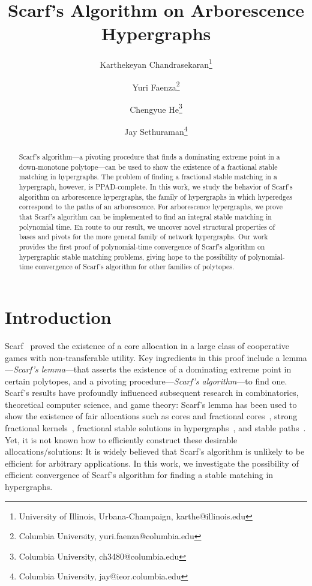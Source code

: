 \documentclass[11pt]{article}
\title{Scarf's Algorithm on Arborescence Hypergraphs}
\author{Karthekeyan Chandrasekaran\thanks{University of Illinois, Urbana-Champaign, karthe@illinois.edu}}
\author{Yuri Faenza\thanks{Columbia University, yuri.faenza@columbia.edu}}
\author{Chengyue He\thanks{Columbia University, ch3480@columbia.edu}}
\author{Jay Sethuraman\thanks{Columbia University, jay@ieor.columbia.edu}}
\affil{}
\date{}
\begin{document}
\maketitle



\begin{abstract}
Scarf’s algorithm---a pivoting procedure that finds a dominating extreme point in a down-monotone polytope---can be used to show the existence of a fractional stable matching in hypergraphs. The problem of finding a fractional stable matching in a hypergraph, however, is PPAD-complete. In this work, we study the behavior of Scarf's algorithm on arborescence hypergraphs, the family of hypergraphs in which hyperedges correspond to the paths of an arborescence. For arborescence hypergraphs, we prove that Scarf's algorithm can be implemented to find an integral stable matching in polynomial time. En route to our result, we uncover novel structural properties of bases and pivots for the more general family of network hypergraphs. Our work provides the first proof of polynomial-time convergence of Scarf's algorithm on hypergraphic stable matching problems, giving hope to the possibility of polynomial-time convergence of Scarf's algorithm for other families of polytopes.
\end{abstract}


\section{Introduction}
Scarf~\cite{scarf1967core} proved the existence of a core allocation in a large class of cooperative games with non-transferable utility.
Key ingredients in this proof include a lemma---{\em Scarf's lemma}---that asserts the existence of a dominating extreme point in certain polytopes, and a pivoting procedure---{\em Scarf's algorithm}---to find one.
Scarf's results have profoundly influenced subsequent research in combinatorics, theoretical computer science, and game theory: Scarf's lemma has been used to show the existence of fair allocations such as cores and fractional cores~\cite{biro2016fractional,scarf1967core}, strong fractional kernels~\cite{aharoni1995fractional}, fractional stable solutions in hypergraphs~\cite{aharoni2003lemma}, and stable paths~\cite{haxell2008fractional}. Yet, it is not known how to efficiently construct these desirable allocations/solutions: It is widely believed that Scarf's algorithm is unlikely to be efficient for arbitrary applications.  
In this work, we investigate the possibility of efficient convergence of Scarf's algorithm for finding a stable matching in hypergraphs.
\end{document}
